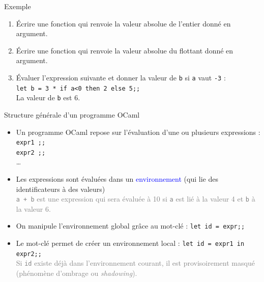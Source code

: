 \documentclass[10pt]{beamer}
\begin{document}
\begin{frame}{\Ctitle}{\stitle}
	\begin{exampleblock}{Exemple}
		\begin{enumerate}
			\item<1-> Écrire une fonction  qui renvoie la valeur absolue de l'entier donné en argument.
				\onslide<2->
			\item<3-> Écrire une fonction  qui renvoie la valeur absolue du flottant donné en argument.
				\onslide<4->
			\item<5-> Évaluer l'expression suivante et donner la valeur de {\tt b} si {\tt a} vaut {\tt -3} :\\
				\texttt{let b = 3 * if a<0 then 2 else 5;;}\\
				\onslide<6->\textcolor{OliveGreen}{La valeur de {\tt b} est 6.}
		\end{enumerate}
	\end{exampleblock}
\end{frame}

\begin{frame}{\Ctitle}{\stitle}
	\begin{block}{Structure générale d'un programme OCaml}
		\begin{itemize}
			\item <1-> Un programme OCaml repose sur l'évaluation d'une ou plusieurs expressions : \\
			      {\tt expr1 ;;} \\
			      {\tt expr2 ;;}\\
			      \dots\\
			\item <2-> Les expressions sont évaluées dans un \textcolor{blue}{environnement} (qui lie des identificateurs à des valeurs) \\
			      \textcolor{gray}{ {\tt a + b} est une expression qui sera évaluée à 10 si {\tt a} est lié à la valeur 4 et {\tt b} à la valeur 6.}
			\item  <3-> On manipule l'environnement \textcolor{BrickRed}{global} grâce au mot-clé  : \texttt{let id = expr;;}
			\item <4-> Le mot-clé  permet de créer un environnement \textcolor{BrickRed}{local} : \texttt{let id = expr1 in expr2;;} \\
			      \textcolor{gray}{Si {\tt id} existe déjà dans l'environnement courant, il est provisoirement masqué (phénomène d'ombrage ou \textit{shadowing}).}
		\end{itemize}
	\end{block}
\end{frame}
\end{document}
